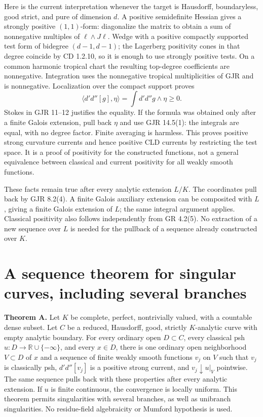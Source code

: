 \documentclass[11pt]{article}
\begin{document}
Here is the current interpretation whenever the target is Hausdorff, boundaryless, good strict, and pure of dimension \(d\). A positive semidefinite Hessian gives a strongly positive \((1,1)\)-form: diagonalize the matrix to obtain a sum of nonnegative multiples of \(\ell\wedge J\ell\). Wedge with a positive compactly supported test form of bidegree \((d-1,d-1)\); the Lagerberg positivity cones in that degree coincide by CD 1.2.10, so it is enough to use strongly positive tests. On a common harmonic tropical chart the resulting top-degree coefficients are nonnegative. Integration uses the nonnegative tropical multiplicities of GJR and is nonnegative. Localization over the compact support proves
\[
\langle d'd''[g],\eta\rangle=\int d'd''g\wedge\eta\ge0.
\]
Stokes in GJR 11--12 justifies the equality. If the formula was obtained only after a finite Galois extension, pull back \(\eta\) and use GJR 14.5(1): the integrals are equal, with no degree factor. Finite averaging is harmless. This proves positive strong curvature currents and hence positive CLD currents by restricting the test space. It is a proof of positivity for the constructed functions, not a general equivalence between classical and current positivity for all weakly smooth functions.

These facts remain true after every analytic extension \(L/K\). The coordinates pull back by GJR 8.2(4). A finite Galois auxiliary extension can be composited with \(L\), giving a finite Galois extension of \(L\); the same integral argument applies. Classical positivity also follows independently from GR 4.2(5). No extraction of a new sequence over \(L\) is needed for the pullback of a sequence already constructed over \(K\).

\section{A sequence theorem for singular curves, including several branches}

\textbf{Theorem A.} Let \(K\) be complete, perfect, nontrivially valued, with a countable dense subset. Let \(C\) be a reduced, Hausdorff, good, strictly \(K\)-analytic curve with empty analytic boundary. For every ordinary open \(D\subset C\), every classical psh \(u:D\to\mathbb R\cup\{-\infty\}\), and every \(x\in D\), there is one ordinary open neighborhood \(V\subset D\) of \(x\) and a sequence of finite weakly smooth functions \(v_j\) on \(V\) such that \(v_j\) is classically psh, \(d'd''[v_j]\) is a positive strong current, and \(v_j\downarrow u|_V\) pointwise. The same sequence pulls back with these properties after every analytic extension. If \(u\) is finite continuous, the convergence is locally uniform. This theorem permits singularities with several branches, as well as unibranch singularities. No residue-field algebraicity or Mumford hypothesis is used.
\end{document}
